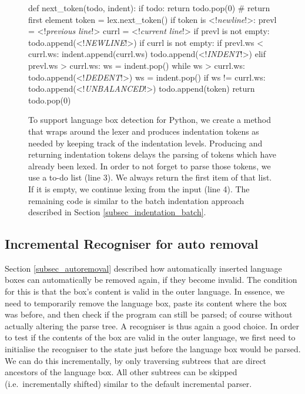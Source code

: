 \documentclass[sigplan,screen]{acmart}\settopmatter{printfolios=true,printccs=false,printacmref=false}
\begin{document}
\begin{figure}
\begin{lstdefault}[basicstyle=\linespread{1.0}\footnotesize\ttfamily]
def next_token(todo, indent):
  if todo:
    return todo.pop(0) # return first element
  token = lex.next_token()
  if token is <!\textit{newline}!>:
    prevl = <!\textit{previous line}!>
    currl = <!\textit{current line}!>
    if prevl is not empty:
      todo.append(<!\textit{NEWLINE}!>)
    if currl is not empty:
      if prevl.ws < currl.ws:
        indent.append(currl.ws)
        todo.append(<!\textit{INDENT}!>)
      elif prevl.ws > currl.ws:
        ws = indent.pop()
        while ws > currl.ws:
          todo.append(<!\textit{DEDENT}!>)
          ws = indent.pop()
        if ws != currl.ws:
          todo.append(<!\textit{UNBALANCED}!>)
  todo.append(token)
  return todo.pop(0)
\end{lstdefault}
\caption{To support language box detection for Python, we
create a method that wraps around the lexer and produces indentation tokens as
needed by keeping track of the indentation levels. Producing and returning
indentation tokens delays the parsing of tokens which have already been lexed.
In order to not forget to parse those tokens, we use a to-do list (line 3). We
always return the first item of that list. If it is empty, we continue lexing
from the input (line 4). The remaining code is similar to the batch indentation
approach described in Section \ref{subsec_indentation_batch}.
}
\label{lst_next_token_indent}
\end{figure}

\subsection{Incremental Recogniser for auto removal}
\label{sec:impl_removerec}

Section \ref{subsec_autoremoval} described how automatically inserted language
boxes can automatically be removed again, if they become invalid. The condition
for this is that the box's content is valid in the outer language.  In essence,
we need to temporarily remove the language box, paste its content where the box
was before, and then check if the program can still be parsed; of course
without actually altering the parse tree. A recogniser is thus again a good
choice. In order to test if the contents of the box are valid in the outer
language, we first need to initialise the recogniser to the state just before
the language box would be parsed. We can do this incrementally, by only
traversing subtrees that are direct ancestors of the language box. All other
subtrees can be skipped (i.e.~incrementally shifted) similar to the default
incremental parser.
\end{document}
